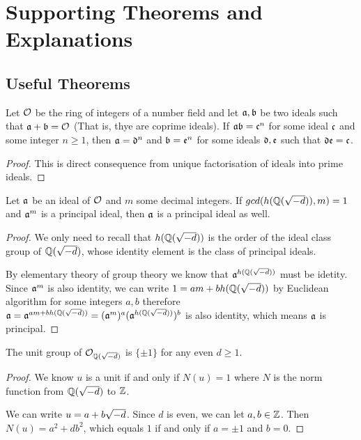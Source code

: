 \section{Supporting Theorems and Explanations}

\subsection{Useful Theorems}

\begin{lemma}\label{lem:gcd-ideals}
	Let $\mathcal{O}$ be the ring of integers of a number field and let $\mathfrak{a}, \mathfrak{b}$ be two ideals such that $\mathfrak{a} + \mathfrak{b} = \mathcal{O}$ (That is, thye are coprime ideals). 
	If $\mathfrak{a}\mathfrak{b} = \mathfrak{c}^n$ for some ideal $\mathfrak{c}$ and some integer $n \geq 1$, then $\mathfrak{a} = \mathfrak{d}^n$ and $\mathfrak{b} = \mathfrak{e}^n$ for some ideals $\mathfrak{d}, \mathfrak{e}$ such that $\mathfrak{d}\mathfrak{e} = \mathfrak{c}$.
\end{lemma}

\begin{proof}
	This is direct consequence from unique factorisation of ideals into prime ideals.
\end{proof}

\begin{lemma}\label{lem:principal}
	Let $\mathfrak{a}$ be an ideal of $\mathcal{O}$ and $m$ some decimal integers.
	If $gcd(h(\mathbb{Q}(\sqrt{-d})), m) = 1$ and $\mathfrak{a}^m$ is a principal ideal, then $\mathfrak{a}$ is a principal ideal as well.
\end{lemma}

\begin{proof}
	We only need to recall that $h(\mathbb{Q}(\sqrt{-d}))$ is the order of the ideal class group of $\mathbb{Q}(\sqrt{-d})$, whose identity element is the class of principal ideals.

	By elementary theory of group theory we know that $\mathfrak{a}^{h(\mathbb{Q}(\sqrt{-d}))}$ must be idetity.
	Since $\mathfrak{a}^m$ is also identity, we can write $1 = am + bh(\mathbb{Q}(\sqrt{-d}))$ by Euclidean algorithm for some integers $a, b$ therefore $\mathfrak{a} = \mathfrak{a}^{am + bh(\mathbb{Q}(\sqrt{-d}))} = (\mathfrak{a}^m)^a (\mathfrak{a}^{h(\mathbb{Q}(\sqrt{-d}))})^b$ is also identity, which means $\mathfrak{a}$ is principal.
\end{proof}

\begin{lemma}\label{lem:unit}
	The unit group of $\mathcal{O}_{\mathbb{Q}(\sqrt{-d})}$ is $\{\pm 1\}$ for any even $d \geq 1$. 
\end{lemma}

\begin{proof}
	We know $u$ is a unit if and only if $N(u) = 1$ where $N$ is the norm function from $\mathbb{Q}(\sqrt{-d})$ to $\mathbb{Z}$.

	We can write $u = a + b \sqrt{-d}$. Since $d$ is even, we can let $a, b \in \mathbb{Z}$.
	Then $N(u) = a^2 + db^2$, which equals $1$ if and only if $a = \pm 1$ and $b = 0$.
\end{proof}

